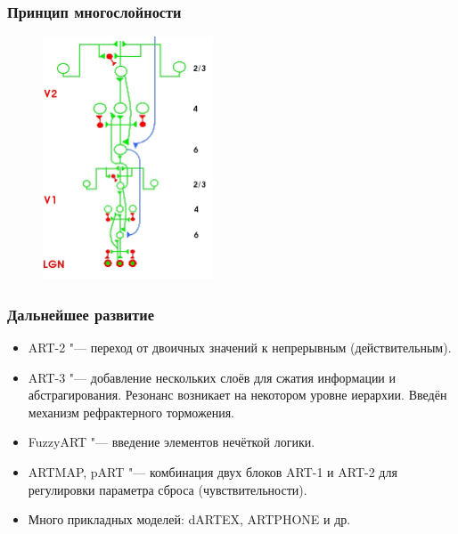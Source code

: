 \documentclass[default]{beamer}
\begin{document}
	\begin{frame}
		\frametitle{Принцип многослойности}
		
		\begin{figure}
			\includegraphics[width=0.45\textwidth]{art_neuro}
		\end{figure}
	\end{frame}
			
	\begin{frame}
		\frametitle{Дальнейшее развитие}
		
		\begin{itemize}
			\item ART-2 "--- переход от двоичных значений к непрерывным (действительным).
			\item ART-3 "--- добавление нескольких слоёв для сжатия информации и абстрагирования. Резонанс возникает на некотором уровне иерархии. Введён механизм рефрактерного торможения.
			\item FuzzyART "--- введение элементов нечёткой логики.
			\item ARTMAP, pART "--- комбинация двух блоков ART-1 и ART-2 для регулировки параметра сброса (чувствительности).
			\item Много прикладных моделей: dARTEX, ARTPHONE и др.
		\end{itemize}
	\end{frame}
	
\end{document}
